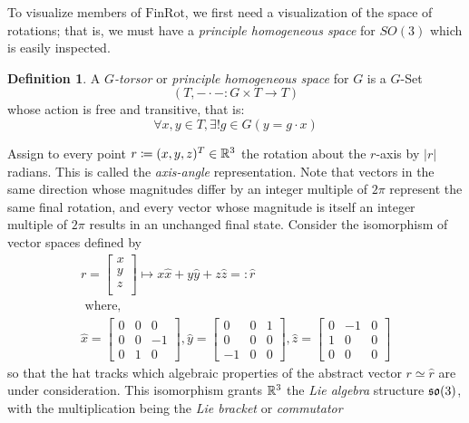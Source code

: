 \documentclass{amsart}
\theoremstyle{plain}
\theoremstyle{definition}
\newtheorem*{definition}{Definition}
\begin{document}
    To visualize members of $\mathrm{FinRot}$, we first need a visualization of the space of rotations; that is, we must have a \emph{principle homogeneous space} for $SO(3)$ which is easily inspected.
    \begin{definition}
       A \emph{$G$-torsor} or \emph{principle homogeneous space} for $G$ is a $G$-Set \[(T,-\cdot-:G\times T\to T)\] whose action is free and transitive, that is:
       \begin{equation}
           \forall x,y\in T,\exists! g\in G(y=g\cdot x)
       \end{equation}
    \end{definition}
    Assign to every point $r\coloneqq(x,y,z)^T\in \mathbb{R}^3$ the rotation about the $r$-axis by $|r|$ radians. This is called the \emph{axis-angle} representation. Note that vectors in the same direction whose magnitudes differ by an integer multiple of $2\pi$ represent the same final rotation, and every vector whose magnitude is itself an integer multiple of $2\pi$ results in an unchanged final state. Consider the isomorphism of vector spaces defined by
    \begin{gather}
        r=\begin{bmatrix}
        x \\
        y \\
        z \\
        \end{bmatrix}\mapsto x\hat{x}+y\hat{y}+z\hat{z}=:\hat{r}\\
        \text{ where, }\nonumber\\
        \hat{x} = \begin{bmatrix}
        0 & 0 & 0 \\
        0 & 0 & -1 \\
        0 & 1 & 0
        \end{bmatrix},
        \hat{y} = \begin{bmatrix}
        0 & 0 & 1 \\
        0 & 0 & 0 \\
        -1 & 0 & 0
        \end{bmatrix},
        \hat{z} = \begin{bmatrix}
        0 & -1 & 0 \\
        1 & 0 & 0 \\
        0 & 0 & 0
        \end{bmatrix}
    \end{gather}
    so that the hat tracks which algebraic properties of the abstract vector $r\simeq \hat{r}$ are under consideration. This isomorphism grants $\mathbb{R}^3$ the \emph{Lie algebra} structure $\mathfrak{so}(3)$, with the multiplication being the \emph{Lie bracket} or \emph{commutator}
\end{document}

